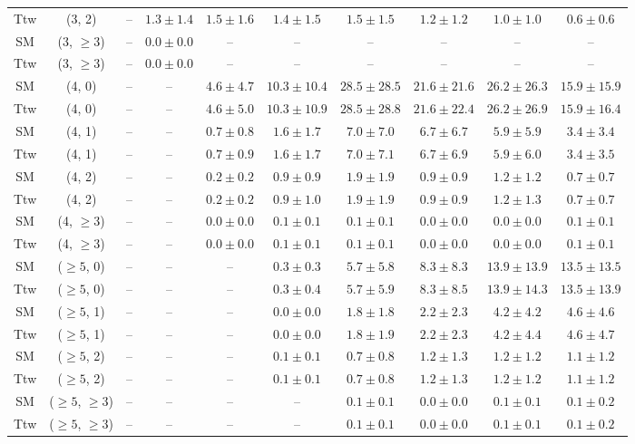 \begin{table}[h!]
{\begin{tabular}{cccccccccc}
	Ttw & (3, 2) & -- & $1.3\pm 1.4$ & $1.5\pm 1.6$ & $1.4\pm 1.5$ & $1.5\pm 1.5$ & $1.2\pm 1.2$ & $1.0\pm 1.0$ & $0.6\pm 0.6$ \\[0.5ex] 
	SM & (3, $\ge3$) & -- & $0.0\pm 0.0$ & -- & -- & -- & -- & -- & -- \\[0.5ex] 
	Ttw & (3, $\ge3$) & -- & $0.0\pm 0.0$ & -- & -- & -- & -- & -- & -- \\[0.5ex] 
	SM & (4, 0) & -- & -- & $4.6\pm 4.7$ & $10.3\pm 10.4$ & $28.5\pm 28.5$ & $21.6\pm 21.6$ & $26.2\pm 26.3$ & $15.9\pm 15.9$ \\[0.5ex] 
	Ttw & (4, 0) & -- & -- & $4.6\pm 5.0$ & $10.3\pm 10.9$ & $28.5\pm 28.8$ & $21.6\pm 22.4$ & $26.2\pm 26.9$ & $15.9\pm 16.4$ \\[0.5ex] 
	SM & (4, 1) & -- & -- & $0.7\pm 0.8$ & $1.6\pm 1.7$ & $7.0\pm 7.0$ & $6.7\pm 6.7$ & $5.9\pm 5.9$ & $3.4\pm 3.4$ \\[0.5ex] 
	Ttw & (4, 1) & -- & -- & $0.7\pm 0.9$ & $1.6\pm 1.7$ & $7.0\pm 7.1$ & $6.7\pm 6.9$ & $5.9\pm 6.0$ & $3.4\pm 3.5$ \\[0.5ex] 
	SM & (4, 2) & -- & -- & $0.2\pm 0.2$ & $0.9\pm 0.9$ & $1.9\pm 1.9$ & $0.9\pm 0.9$ & $1.2\pm 1.2$ & $0.7\pm 0.7$ \\[0.5ex] 
	Ttw & (4, 2) & -- & -- & $0.2\pm 0.2$ & $0.9\pm 1.0$ & $1.9\pm 1.9$ & $0.9\pm 0.9$ & $1.2\pm 1.3$ & $0.7\pm 0.7$ \\[0.5ex] 
	SM & (4, $\ge3$) & -- & -- & $0.0\pm 0.0$ & $0.1\pm 0.1$ & $0.1\pm 0.1$ & $0.0\pm 0.0$ & $0.0\pm 0.0$ & $0.1\pm 0.1$ \\[0.5ex] 
	Ttw & (4, $\ge3$) & -- & -- & $0.0\pm 0.0$ & $0.1\pm 0.1$ & $0.1\pm 0.1$ & $0.0\pm 0.0$ & $0.0\pm 0.0$ & $0.1\pm 0.1$ \\[0.5ex] 
	SM & ($\ge5$, 0) & -- & -- & -- & $0.3\pm 0.3$ & $5.7\pm 5.8$ & $8.3\pm 8.3$ & $13.9\pm 13.9$ & $13.5\pm 13.5$ \\[0.5ex] 
	Ttw & ($\ge5$, 0) & -- & -- & -- & $0.3\pm 0.4$ & $5.7\pm 5.9$ & $8.3\pm 8.5$ & $13.9\pm 14.3$ & $13.5\pm 13.9$ \\[0.5ex] 
	SM & ($\ge5$, 1) & -- & -- & -- & $0.0\pm 0.0$ & $1.8\pm 1.8$ & $2.2\pm 2.3$ & $4.2\pm 4.2$ & $4.6\pm 4.6$ \\[0.5ex] 
	Ttw & ($\ge5$, 1) & -- & -- & -- & $0.0\pm 0.0$ & $1.8\pm 1.9$ & $2.2\pm 2.3$ & $4.2\pm 4.4$ & $4.6\pm 4.7$ \\[0.5ex] 
	SM & ($\ge5$, 2) & -- & -- & -- & $0.1\pm 0.1$ & $0.7\pm 0.8$ & $1.2\pm 1.3$ & $1.2\pm 1.2$ & $1.1\pm 1.2$ \\[0.5ex] 
	Ttw & ($\ge5$, 2) & -- & -- & -- & $0.1\pm 0.1$ & $0.7\pm 0.8$ & $1.2\pm 1.3$ & $1.2\pm 1.2$ & $1.1\pm 1.2$ \\[0.5ex] 
	SM & ($\ge5$, $\ge3$) & -- & -- & -- & -- & $0.1\pm 0.1$ & $0.0\pm 0.0$ & $0.1\pm 0.1$ & $0.1\pm 0.2$ \\[0.5ex] 
	Ttw & ($\ge5$, $\ge3$) & -- & -- & -- & -- & $0.1\pm 0.1$ & $0.0\pm 0.0$ & $0.1\pm 0.1$ & $0.1\pm 0.2$ \\[0.5ex] 
	\hline
	\hline
\end{tabular}}
\end{table}
